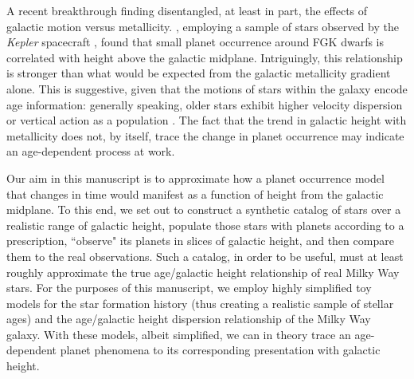 \documentclass[twocolumn]{aastex631}
\begin{document}
 A recent breakthrough finding disentangled, at least in part, the effects of galactic motion versus metallicity. \cite{zink_scaling_2023}, employing a sample of stars observed by the \textit{Kepler} spacecraft \citep{Borucki10}, found that small planet occurrence around FGK dwarfs is correlated with height above the galactic midplane. Intriguingly, this relationship is stronger than what would be expected from the galactic metallicity gradient alone. This is suggestive, given that the motions of stars within the galaxy encode age information: generally speaking, older stars exhibit higher velocity dispersion or vertical action as a population \citep{wielen_diffusion_1977, rocha-pinto_chemical_2004, almeida-fernandes_method_2018}. The fact that the trend in galactic height with metallicity does not, by itself, trace the change in planet occurrence may indicate an age-dependent process at work.  
 
 Our aim in this manuscript is to approximate how a planet occurrence model that changes in time would manifest as a function of height from the galactic midplane. To this end, we set out to construct a synthetic catalog of stars over a realistic range of galactic height, populate those stars with planets according to a prescription, ``observe" its planets in slices of galactic height, and then compare them to the real observations. Such a catalog, in order to be useful, must at least roughly approximate the true age/galactic height relationship of real Milky Way stars. For the purposes of this manuscript, we employ highly simplified toy models for the star formation history (thus creating a realistic sample of stellar ages) and the age/galactic height dispersion relationship of the Milky Way galaxy. With these models, albeit simplified, we can in theory trace an age-dependent planet phenomena to its corresponding presentation with galactic height. 
 
\end{document}
